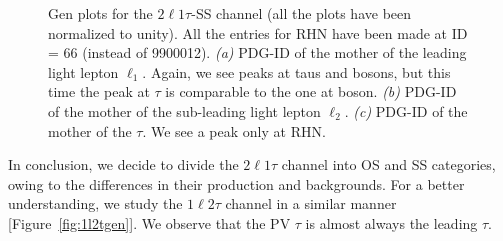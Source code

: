 \documentclass[letterpaper,12pt]{article}
\begin{document}
\begin{figure}[h]
\centering
{}%
\quad
{}%
\quad
{}%
\quad

\caption{Gen plots for the $2\ell1\tau$-SS channel (all the plots have been normalized to unity). All the entries for RHN have been made at ID = 66 (instead of 9900012). \emph{(a)} PDG-ID of the mother of the leading light lepton $\ell_{1}$. Again, we see peaks at taus and \Wboson{} bosons, but this time the peak at $\tau$ is comparable to the one at \Wboson{} boson. \emph{(b)} PDG-ID of the mother of the sub-leading light lepton $\ell_{2}$. \emph{(c)} PDG-ID of the mother of the $\tau$. We see a peak only at RHN.}
\label{fig:2l1tSSgen}  
\end{figure}
\vspace{0.7cm}

In conclusion, we decide to divide the $2\ell1\tau$ channel into OS and SS categories, owing to the differences in their production and backgrounds. For a better understanding, we study the $1\ell2\tau$ channel in a similar manner [Figure~\ref{fig:1l2tgen}]. We observe that the PV $\tau$ is almost always the leading $\tau$.
\end{document}
